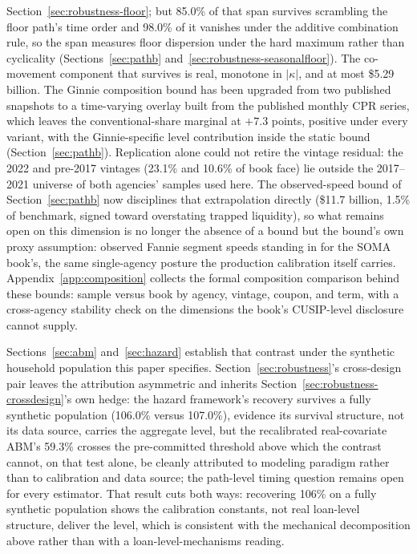 \documentclass[12pt]{article}
\begin{document}
Section~\ref{sec:robustness-floor}; but 85.0\% of that span survives scrambling the floor path's time order and 98.0\% of it vanishes under the additive combination rule, so the span measures floor dispersion under the hard maximum rather than cyclicality (Sections~\ref{sec:pathb} and~\ref{sec:robustness-seasonalfloor}). The co-movement component that survives is real, monotone in $|\kappa|$, and at most \$5.29 billion. The Ginnie composition bound has been upgraded from two published snapshots to a time-varying overlay built from the published monthly CPR series, which leaves the conventional-share marginal at $+7.3$ points, positive under every variant, with the Ginnie-specific level contribution inside the static bound (Section~\ref{sec:pathb}). Replication alone could not retire the vintage residual: the 2022 and pre-2017 vintages (23.1\% and 10.6\% of book face) lie outside the 2017--2021 universe of both agencies' samples used here. The observed-speed bound of Section~\ref{sec:pathb} now disciplines that extrapolation directly (\$11.7 billion, 1.5\% of benchmark, signed toward overstating trapped liquidity), so what remains open on this dimension is no longer the absence of a bound but the bound's own proxy assumption: observed Fannie segment speeds standing in for the SOMA book's, the same single-agency posture the production calibration itself carries. Appendix~\ref{app:composition} collects the formal composition comparison behind these bounds: sample versus book by agency, vintage, coupon, and term, with a cross-agency stability check on the dimensions the book's CUSIP-level disclosure cannot supply.

Sections~\ref{sec:abm} and~\ref{sec:hazard} establish that contrast under the synthetic household population this paper specifies. Section~\ref{sec:robustness}'s cross-design pair leaves the attribution asymmetric and inherits Section~\ref{sec:robustness-crossdesign}'s own hedge: the hazard framework's recovery survives a fully synthetic population (106.0\% versus 107.0\%), evidence its survival structure, not its data source, carries the aggregate level, but the recalibrated real-covariate ABM's 59.3\% crosses the pre-committed threshold above which the contrast cannot, on that test alone, be cleanly attributed to modeling paradigm rather than to calibration and data source; the path-level timing question remains open for every estimator. That result cuts both ways: recovering 106\% on a fully synthetic population shows the calibration constants, not real loan-level structure, deliver the level, which is consistent with the mechanical decomposition above rather than with a loan-level-mechanisms reading.
\end{document}
